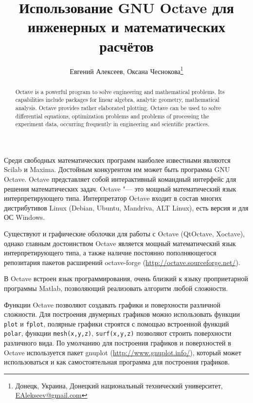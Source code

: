 \documentclass[10pt, a5paper]{article}
\begin{document}
\title{Использование GNU Octave для инженерных и математических расчётов}

\author{Евгений Алексеев, Оксана Чеснокова\footnote{Донецк, Украина, Донецкий национальный технический университет, \url{EAlekseev@gmail.com}}}
\maketitle

\begin{abstract}
Octave is a powerful program to solve engineering and mathe\-matical problems. Its capabilities include packages for linear algebra, analytic geometry, mathematical analysis. Octave pro\-vides rather elaborated plotting. Octave can be used to solve differential equations, optimization problems and problems of processing the experiment data, occurring frequently in engi\-neering and scientific practices.
\end{abstract}

Среди свободных математических программ наиболее известными являются Scilab и Maxima. Достойным конкурентом им может быть программа GNU Octave. Octave представляет собой  интерактивный командный интерфейс для решения математических задач. Octave "--- это мощный математический язык  интерпретирующего типа. Интерпретатор Octave входит в состав многих дистрибутивов Linux (Debian, Ubuntu, Mandriva, ALT Linux), есть версия и для ОС Windows.

Существуют и графические оболочки для работы с Octave (Qt\-Octave, Xoctave), однако главным достоинством Octave является мощный математический язык интерпретирующего типа, а также наличие постоянно пополняющегося репозитария пакетов расширений octave-forge (\url{http://octave.sourceforge.net/}).

В Octave встроен язык программирования, очень близкий к языку проприетарной программы Matlab, позволяющий  реализовать алгоритм любой сложности.

Функции Octave позволяют создавать графики и поверхности различной сложности. Для построения двумерных графиков можно использовать функции \verb!plot! и \verb!fplot!, полярные графики строятся с помощью встроенной функций \verb!polar!, функции \verb!mesh(x,y,z)!, \verb!surf(x,y,z)! позволяют строить поверхности различного вида. По умолчанию для построения графиков и поверхностей в Octave используется пакет gnuplot (\url{http://www.gnuplot.info/}), который может использоваться и как самостоятельная программа для построения графиков.
\end{document}
